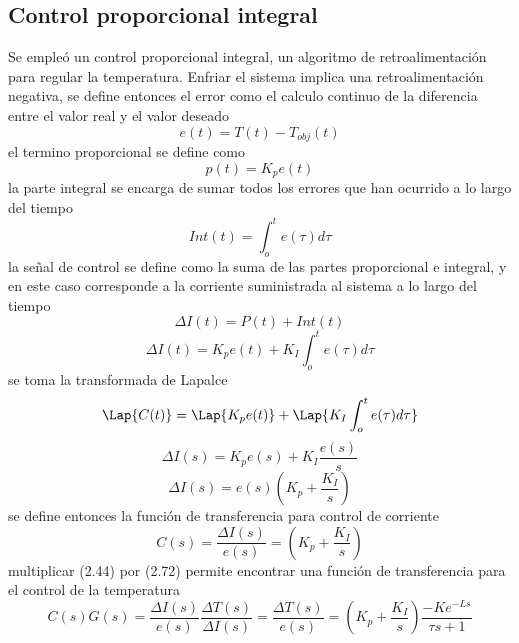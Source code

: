 \subsection{Control proporcional integral}
Se empleó un control proporcional integral, un algoritmo de retroalimentación para regular la temperatura.
Enfriar el sistema implica una retroalimentación negativa, se define entonces el error como el calculo continuo de la diferencia entre el valor real y el valor deseado 
\begin{equation}
    e(t)= T(t)-T_{obj}(t)
\end{equation}
el termino proporcional se define como  
\begin{equation}
    p(t) = K_{p}e(t)
\end{equation}
la parte integral se encarga de sumar todos los errores que han ocurrido a lo largo del tiempo 
\begin{equation}
    Int(t) = \int_{o}^{t}e(\tau)d\tau
\end{equation}
la señal de control se define como la suma de las partes proporcional e integral, y en este caso corresponde a la corriente suministrada al sistema a lo largo  del tiempo  
\begin{equation}
    \Delta I(t) = P(t) + Int(t)
\end{equation}
\begin{equation}
   \Delta I(t) =  K_{p}e(t) + K_{I}\int_{o}^{t}e(\tau)d\tau
\end{equation}
se toma la transformada de Lapalce 
\begin{equation}
     \Lap{C(t)} =  \Lap{K_{p}e(t)} + \Lap{K_{I}\int_{o}^{t}e(\tau)d\tau}
\end{equation}
\begin{equation}
    \Delta I(s)= K_{p}e(s) + K_{I}\frac{e(s)}{s}
\end{equation}
\begin{equation}
    \Delta I(s) = e(s)(K_{p} + \frac{K_{I}}{s})
\end{equation}
se define entonces la  función de transferencia para control de corriente  
\begin{equation}
    C(s) = \frac{\Delta I(s)}{e(s)} = (K_{p} + \frac{K_{I}}{s})
\end{equation}
multiplicar (2.44) por (2.72) permite encontrar una función de transferencia para el control de la temperatura 
\begin{equation}
    C(s)G(s)= \frac{\Delta I(s)}{e(s)}\frac{\Delta T(s)}{\Delta I(s)} = \frac{\Delta T(s)}{e(s)} = (K_{p} + \frac{K_{I}}{s})\frac{-Ke^{-Ls}}{\tau s +1}
\end{equation}
